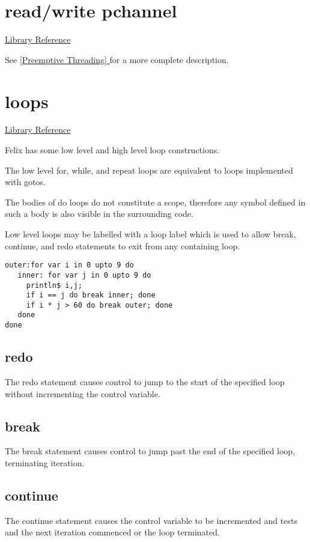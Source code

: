 \documentclass[oneside]{book}
\newcommand*{\fullref}[1]{\hyperref[{#1}]{\autoref*{#1} \nameref*{#1}}}
\begin{document}
\section{read/write pchannel}
\href{http://felix-lang.org/share/lib/std/control/pchannels.flx}{Library Reference}

See \fullref{Preemptive Threading} for a more complete
description.


\section{loops}
\href{http://felix-lang.org/share/lib/grammar/loops.fsyn}{Library Reference}

Felix has some low level and high level loop constructions.

The low level for, while, and repeat loops are equivalent
to loops implemented with gotos.

The bodies of do loops do not constitute a scope,
therefore any symbol defined in such a body is also visible
in the surrounding code.

Low level loops may be labelled with a loop label
which is used to allow break, continue, and redo
statements to exit from any containing loop.


\begin{verbatim}
outer:for var i in 0 upto 9 do
   inner: for var j in 0 upto 9 do
     println$ i,j;
     if i == j do break inner; done
     if i * j > 60 do break outer; done
   done
done
\end{verbatim}


\subsection{redo}
The redo statement causes control to jump to the start
of the specified loop without incrementing the control variable.

\subsection{break}
The break statement causes control to jump past the end of
the specified loop, terminating iteration.

\subsection{continue}
The continue statement causes the control variable to
be incremented and tests and the next iteration commenced
or the loop terminated.
\end{document}
